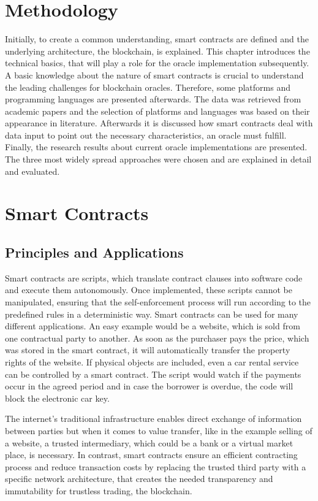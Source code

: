 \documentclass[conference]{IEEEtran}
\begin{document}
\section{Methodology}
Initially, to create a common understanding, smart contracts are defined and the underlying architecture, the blockchain, is explained. This chapter introduces the technical basics, that will play a role for the oracle implementation subsequently. A basic knowledge about the nature of smart contracts is crucial to understand the leading challenges for blockchain oracles. Therefore, some platforms and programming languages are presented afterwards. The data was retrieved from academic papers and the selection of platforms and languages was based on their appearance in literature. Afterwards it is discussed how smart contracts deal with data input to point out the necessary characteristics, an oracle must fulfill. Finally, the research results about current oracle implementations are presented. The three most widely spread approaches were chosen and are explained in detail and evaluated.
\section{Smart Contracts}
\subsection{Principles and Applications}

Smart contracts are scripts, which translate contract clauses into software code and execute them autonomously. Once implemented, these scripts cannot be manipulated, ensuring that the self-enforcement process will run according to the predefined rules in a deterministic way.   
Smart contracts can be used for many different applications. An easy example would be a website, which is sold from one contractual party to another. As soon as the purchaser pays the price, which was stored in the smart contract, it will automatically transfer the property rights of the website. If physical objects are included, even a car rental service can be controlled by a smart contract. The script would watch if the payments occur in the agreed period and in case the borrower is overdue, the code will block the electronic car key. \cite{Meitinger2017} \cite{Spancken2016} \cite{Jung2017} \cite{Lee2016}\par 
The internet's traditional infrastructure enables direct exchange of information between parties but when it comes to value transfer, like in the example selling of a website, a trusted intermediary, which could be a bank or a virtual market place, is necessary. In contrast, smart contracts ensure an efficient contracting process and reduce transaction costs by replacing the trusted third party with a specific network architecture, that creates the needed transparency and immutability for trustless trading, the blockchain. \cite{Meitinger2017}
\end{document}
